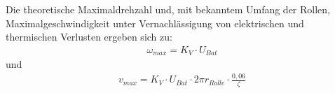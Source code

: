 	Die theoretische Maximaldrehzahl und, mit bekanntem Umfang der Rollen, Maximalgeschwindigkeit unter Vernachlässigung von elektrischen und thermischen Verlusten ergeben sich zu:
	\begin{align}
		\omega_{max} = K_V \cdot U_{Bat}
		\label{eq:max rpm}
	\end{align}
	und
	\begin{align}
		v_{max} = K_V \cdot U_{Bat} \cdot 2\pi r_{Rolle} \cdot \frac{0,06}{\zeta}
		\label{eq:max speed km h}
	\end{align}
	\nocite{Meschede.2015}\nocite{Demtroder.2018}